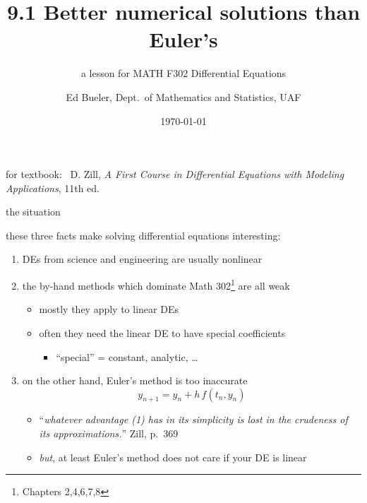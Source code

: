 \documentclass[urlcolor=blue,dvipsnames]{beamer}
\title{9.1 Better numerical solutions than Euler's}
\subtitle{a lesson for MATH F302 Differential Equations}
\author{Ed Bueler, Dept.~of Mathematics and Statistics, UAF}
\date{\tiny \today}
\begin{document}
\renewcommand{\thefootnote}{{\color{green} \arabic{footnote}}}

\begin{frame}
\titlepage

\centerline{\tiny for textbook: \, D. Zill, \emph{A First Course in Differential Equations with Modeling Applications}, 11th ed.}
\end{frame}


\begin{frame}{the situation}

these three facts make solving differential equations interesting:
\begin{enumerate}
\item \alert{DEs} from science and engineering are usually \alert{nonlinear}
\item the \alert{by-hand methods} which dominate Math 302\footnote{Chapters 2,4,6,7,8} are all \alert{weak}
    \begin{itemize}
    \item mostly they apply to linear DEs
    \item often they need the linear DE to have special coefficients
        \begin{itemize}
        \item ``special'' = constant, analytic, \dots
        \end{itemize}
    \end{itemize}
\item on the other hand, \alert{Euler's method} is too \alert{inaccurate}
\begin{equation}
    y_{n+1} = y_n + h\, f(t_n,y_n)
\end{equation}

\vspace{-2mm}
    \begin{itemize}
    \item ``\emph{whatever advantage {\normalfont (1)} has in its simplicity is lost in the crudeness of its approximations.}'' \hfill Zill, p.~369
    \item \emph{but}, at least Euler's method does not care if your DE is linear
    \end{itemize}
\end{enumerate}
\end{frame}
\end{document}
